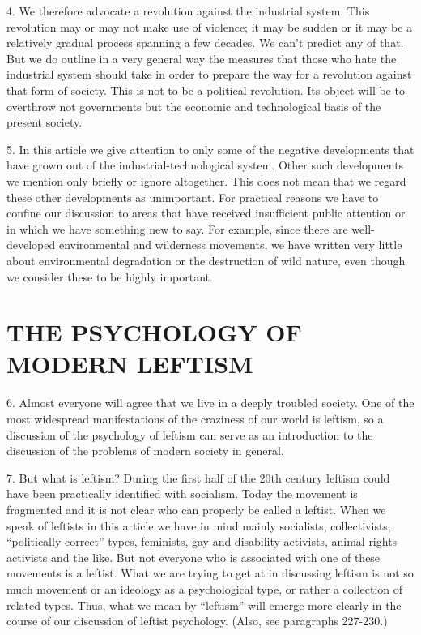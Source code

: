 \documentclass{article}
\begin{document}
4. We therefore advocate a revolution against the industrial system. This revolution may or may 
not make use of violence; it may be sudden or it may be a relatively gradual process spanning a 
few decades. We can’t predict any of that. But we do outline in a very general way the measures 
that those who hate the industrial system should take in order to prepare the way for a revolution 
against that form of society. This is not to be a political revolution. Its object will be to overthrow not governments but the economic and technological basis of the present society. \vspace{\baselineskip}

5. In this article we give attention to only some of the negative developments that have grown out 
of the industrial-technological system. Other such developments we mention only briefly or 
ignore altogether. This does not mean that we regard these other developments as 
unimportant. For practical reasons we have to confine our discussion to areas that have received 
insufficient public attention or in which we have something new to say. For example, since there 
are well-developed environmental and wilderness movements, we have written very little about 
environmental degradation or the destruction of wild nature, even though we consider these to be 
highly important.


\section{THE PSYCHOLOGY OF MODERN LEFTISM}

\hspace{0.5cm} 6. Almost everyone will agree that we live in a deeply troubled society. One of the most 
widespread manifestations of the craziness of our world is leftism, so a discussion of the 
psychology of leftism can serve as an introduction to the discussion of the problems of modern 
society in general. \vspace{\baselineskip}

7. But what is leftism? During the first half of the 20th century leftism could have been practically 
identified with socialism. Today the movement is fragmented and it is not clear who can properly 
be called a leftist. When we speak of leftists in this article we have in mind mainly socialists, 
collectivists, “politically correct” types, feminists, gay and disability activists, animal rights 
activists and the like. But not everyone who is associated with one of these movements is a 
leftist. What we are trying to get at in discussing leftism is not so much movement or an ideology 
as a psychological type, or rather a collection of related types. Thus, what we mean by “leftism” 
will emerge more clearly in the course of our discussion of leftist psychology. (Also, see paragraphs 227-230.) \vspace{\baselineskip}
\end{document}
